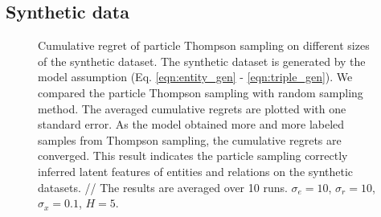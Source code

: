\documentclass{article}
\begin{document}
\subsection{Synthetic data}
\begin{figure}[t]
	\centering
	
	\caption{\label{fig:synthetic} Cumulative regret of particle Thompson sampling on different sizes of the synthetic dataset. The synthetic dataset is generated by the model assumption (Eq. \ref{eqn:entity_gen} - \ref{eqn:triple_gen}). We compared the particle Thompson sampling with random sampling method. The averaged cumulative regrets are plotted with one standard error. As the model obtained more and more labeled samples from Thompson sampling, the cumulative regrets are converged. This result  indicates the particle sampling correctly inferred latent features of entities and relations on the synthetic datasets. // The results are averaged over 10 runs. $\sigma_e = 10$, $\sigma_r=10$, $\sigma_x=0.1$, $H=5$.}
\end{figure}
\end{document}
